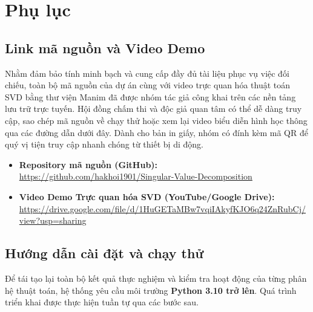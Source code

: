﻿\appendix
\section{Phụ lục}

\subsection{Link mã nguồn và Video Demo}

Nhằm đảm bảo tính minh bạch và cung cấp đầy đủ tài liệu phục vụ việc đối chiếu, toàn bộ mã nguồn của dự án cùng với video trực quan hóa thuật toán SVD bằng thư viện Manim đã được nhóm tác giả công khai trên các nền tảng lưu trữ trực tuyến. Hội đồng chấm thi và độc giả quan tâm có thể dễ dàng truy cập, sao chép mã nguồn về chạy thử hoặc xem lại video biểu diễn hình học thông qua các đường dẫn dưới đây. Dành cho bản in giấy, nhóm có đính kèm mã QR để quý vị tiện truy cập nhanh chóng từ thiết bị di động.

\begin{itemize}
    \item \textbf{Repository mã nguồn (GitHub):} \\
    \url{https://github.com/hakhoi1901/Singular-Value-Decomposition}
    \item \textbf{Video Demo Trực quan hóa SVD (YouTube/Google Drive):} \\
    \url{https://drive.google.com/file/d/1HuGETaMBw7vqiIAkyfKJO6q24ZnRubCj/view?usp=sharing}
\end{itemize}

\newpage

\subsection{Hướng dẫn cài đặt và chạy thử}

Để tái tạo lại toàn bộ kết quả thực nghiệm và kiểm tra hoạt động của từng phân hệ thuật toán, hệ thống yêu cầu môi trường \textbf{Python 3.10 trở lên}. Quá trình triển khai được thực hiện tuần tự qua các bước sau.

